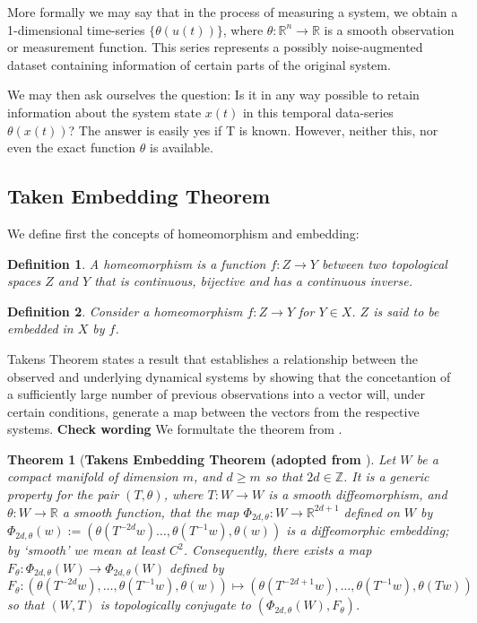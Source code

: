 \documentclass[12 pt]{article}
\newtheorem{Definition}{Definition}[]
\newtheorem{Theorem}{Theorem}[]
\newcommand{\Ftheta}{\ensuremath{F_\theta}}
\begin{document}
More formally we may say that in the process of measuring a system, we obtain a 1-dimensional time-series $\{\theta(u(t))\}$, where $\theta:\mathbb{R}^n\to\mathbb{R}$ is a smooth observation or measurement function. This series represents a possibly noise-augmented dataset containing information of certain parts of the original system. 

We may then ask ourselves the question: Is it in any way possible to retain information about the system state $x(t)$ in this temporal data-series $\theta(x(t))$? The answer is easily yes if T is known. However, neither this, nor even the exact function $\theta$ is available. 

\subsection{Taken Embedding Theorem}

We define first the concepts of homeomorphism and embedding:
\begin{Definition}
  A homeomorphism is a function $f:Z\rightarrow Y$ between two topological spaces $Z$ and $Y$ that is continuous, bijective and has a continuous inverse. 
\end{Definition}

\begin{Definition}
  Consider a homeomorphism $f:Z\rightarrow Y$ for $Y\in X$. $Z$ is said to be embedded in $X$ by $f$.
\end{Definition}

Takens Theorem states a result that establishes a relationship between the observed and underlying dynamical systems by showing that the concetantion of a sufficiently large number of previous observations into a vector will, under certain conditions, generate a map between the vectors from the respective systems. \textbf{Check wording} We formultate the theorem from \cite{takens1981detecting}.  

\begin{Theorem} 
	[\bf Takens Embedding Theorem (adopted from \cite{takens1981detecting}] \label{Thm_Takens}
            Let $W$ be a compact manifold of dimension $m$, and $d\ge m$ so that $2d\in\mathbb{Z}$. It is a 
            generic property for the pair $(T, \theta)$,  where $T:W \to W$ is
            a smooth diffeomorphism, and $\theta:W \to \mathbb{R}$ a smooth function, that the map $\Phi_{2d,\theta}:W \to \mathbb{R}^{2d+1}$ defined on $W$ by 
            $\Phi_{2d,\theta}(w) := (\theta(T^{-2d}w)\ldots,\theta(T^{-1}w),\theta(w))$
            is a diffeomorphic embedding; by `smooth' we mean at least $C^2$. Consequently, there exists a map $\Ftheta: \Phi_{2d,\theta}(W) \to \Phi_{2d,\theta}(W)$ defined by 
            \begin{equation}  \label{eqn_takens}
              \Ftheta: (\theta(T^{-2d}w),\ldots,\theta(T^{-1}w),\theta(w)) \mapsto  (\theta(T^{-2d+1}w),\ldots,\theta(T^{-1}w),\theta(Tw))
            \end{equation}
           so that $(W,T)$ is topologically conjugate to 
            $(\Phi_{2d,\theta}(W), \Ftheta)$.   
\end{Theorem} 
\end{document}
